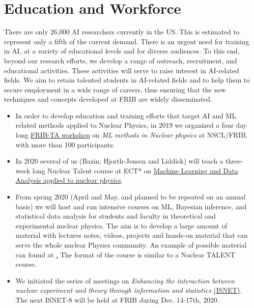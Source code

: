 \documentclass[%
10pt]{article}
\begin{document}
\clearpage
\newpage






\section{Education and Workforce}

There are only 26,000 AI researchers currently in the US. This is estimated to represent only a fifth of the current demand. There is an urgent need for training in AI, at a variety of educational levels and for diverse audiences. To this end, beyond our research efforts, we develop a range of outreach, recruitment, and educational activities. These activities will serve to raise interest in AI-related fields. We aim to retain talented students in AI-related fields and to help them to secure employment in a wide range of careers, thus ensuring that the new techniques and concepts developed at FRIB are widely disseminated.


\begin{itemize}

\item In order to develop education and training efforts that target AI and ML related methods applied to Nuclear Physics, in 2019 we  organized a four day long  \href{https://indico.frib.msu.edu/event/16/timetable/?view=standard}{FRIB-TA workshop} on {\it ML methods in Nuclear physics} at  NSCL/FRIB, with more than 100 participants.

\item In 2020 several of us (Bazin, Hjorth-Jensen and Liddick) will teach a three-week long Nuclear Talent course at ECT*  on \href{https://www.ectstar.eu/node/4472}{Machine Learning and Data Analysis applied to nuclear physics}. 


\item From spring 2020 (April and May, and planned to be repeated on an annual basis) we will host and run intensive courses on ML, Bayesian inference, and statistical data analysis for students and faculty in theoretical and experimental nuclear physics. The aim is to develop a large amount of material with lectures notes, videos, projects and hands-on material that can serve the whole nuclear Physics community. An example of possible material can found at \href{https://compphysics.github.io/MachineLearning/doc/web/course.html}.  The format of the course is similar to a Nuclear TALENT course.

\item
We initiated the series of meetings on {\it Enhancing the interaction between nuclear experiment and theory through information and statistics} \href{https://isnet-series.github.io/meetings/isnet/}{(ISNET)}.  The next ISNET-8 will be held at FRIB during  Dec. 14-17th, 2020.

\end{itemize}
\end{document}
